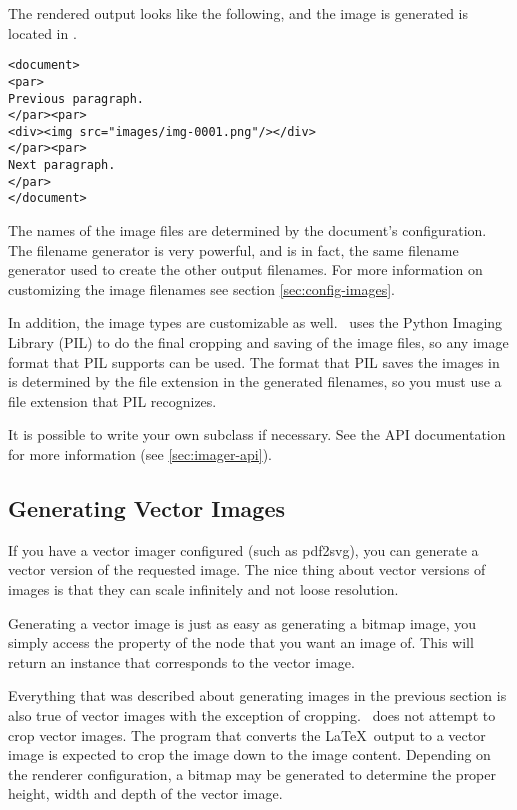 The rendered output looks like the following, and the image is generated
is located in .
\begin{verbatim}
<document>
<par>
Previous paragraph.
</par><par>
<div><img src="images/img-0001.png"/></div>
</par><par>
Next paragraph.
</par>
</document>
\end{verbatim}

The names of the image files are determined by the document's configuration.
The filename generator is very powerful, and is in fact, the same filename
generator used to create the other output filenames.  For more information
on customizing the image filenames see section \ref{sec:config-images}.

In addition, the image types are customizable as well.  \plasTeX\ uses
the Python Imaging Library (PIL) to do the final cropping and saving of the
image files, so any image format that PIL supports can be used.  The
format that PIL saves the images in is determined by the file extension
in the generated filenames, so you must use a file extension that
PIL recognizes.

It is possible to write your own  subclass if necessary.
See the  API documentation for more information (see
\ref{sec:imager-api}).


\subsection{Generating Vector Images}

If you have a vector imager configured (such as pdf2svg), you
can generate a vector version of the requested image. The nice thing about
vector versions of images is that they can scale infinitely and not loose
resolution.

Generating a vector image is just as easy as generating a bitmap image,
you simply access the  property of the node that
you want an image of.  This will return an 
instance that corresponds to the vector image.

Everything that was described about generating images in the previous
section is also true of vector images with the exception of cropping.
\plasTeX\ does not attempt to crop vector images.  The program that
converts the \LaTeX\ output to a vector image is expected to crop the
image down to the image content.  Depending on the renderer configuration, a
bitmap may be generated to determine the proper height, width and depth of
the vector image.



